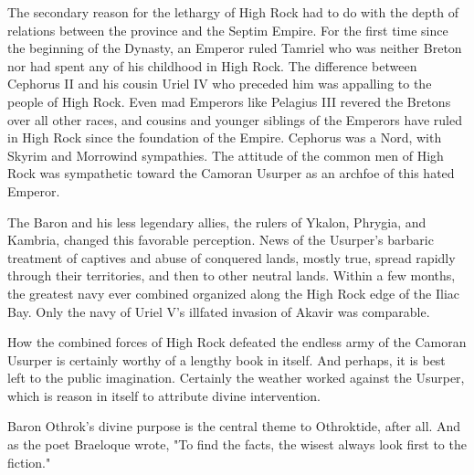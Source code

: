 The secondary reason for the lethargy of High Rock had to do with the depth of relations between the province and the Septim Empire. For the first time since the beginning of the Dynasty, an Emperor ruled Tamriel who was neither Breton nor had spent any of his childhood in High Rock. The difference between Cephorus II and his cousin Uriel IV who preceded him was appalling to the people of High Rock. Even mad Emperors like Pelagius III revered the Bretons over all other races, and cousins and younger siblings of the Emperors have ruled in High Rock since the foundation of the Empire. Cephorus was a Nord, with Skyrim and Morrowind sympathies. The attitude of the common men of High Rock was sympathetic toward the Camoran Usurper as an archfoe of this hated Emperor.

The Baron and his less legendary allies, the rulers of Ykalon, Phrygia, and Kambria, changed this favorable perception. News of the Usurper's barbaric treatment of captives and abuse of conquered lands, mostly true, spread rapidly through their territories, and then to other neutral lands. Within a few months, the greatest navy ever combined organized along the High Rock edge of the Iliac Bay. Only the navy of Uriel V's illfated invasion of Akavir was comparable.

How the combined forces of High Rock defeated the endless army of the Camoran Usurper is certainly worthy of a lengthy book in itself. And perhaps, it is best left to the public imagination. Certainly the weather worked against the Usurper, which is reason in itself to attribute divine intervention.

Baron Othrok's divine purpose is the central theme to Othroktide, after all. And as the poet Braeloque wrote, "To find the facts, the wisest always look first to the fiction."